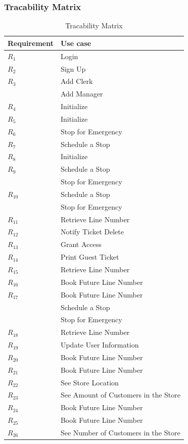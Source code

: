 \subsubsection{Tracability Matrix}
\begin{table}[H]
    \begin{tabular}{|p{8cm}|p{8cm}|}
        \hline
        \textbf{Requirement} & \textbf{Use case} \\ \hline
        $R_{1}$ & Login\\ \hline
        $R_{2}$ & Sign Up\\ \hline
        $R_{3}$ & Add Clerk\\
        & Add Manager \\ \hline
        $R_{4}$ & Initialize \\ \hline
        $R_{5}$ & Initialize \\ \hline
        $R_{6}$ & Stop for Emergency\\ \hline
        $R_{7}$ & Schedule a Stop\\ \hline
        $R_{8}$ & Initialize \\ \hline
        $R_{9}$ & Schedule a Stop\\
        & Stop for Emergency \\ \hline
        $R_{10}$ & Schedule a Stop\\
        & Stop for Emergency\\ \hline
        $R_{11}$ & Retrieve Line Number\\ \hline
        $R_{12}$ & Notify Ticket Delete \\ \hline
        $R_{13}$ & Grant Access \\ \hline
        $R_{14}$ & Print Guest Ticket \\ \hline
        $R_{15}$ & Retrieve Line Number \\ \hline
        $R_{16}$ & Book Future Line Number\\ \hline
        $R_{17}$ & Book Future Line Number \\
        & Schedule a Stop \\
        & Stop for Emergency\\ \hline
        $R_{18}$ & Retrieve Line Number \\ \hline
        $R_{19}$ & Update User Information\\ \hline
        $R_{20}$ & Book Future Line Number\\ \hline
        $R_{21}$ & Book Future Line Number\\ \hline
        $R_{22}$ & See Store Location\\ \hline
        $R_{23}$ & See Amount of Customers in the Store\\ \hline
        $R_{24}$ & Book Future Line Number\\ \hline
        $R_{25}$ & Book Future Line Number\\ \hline
        $R_{26}$ & See Number of Customers in the Store\\ \hline
    \end{tabular}
    \caption{Tracability Matrix}
\end{table}
